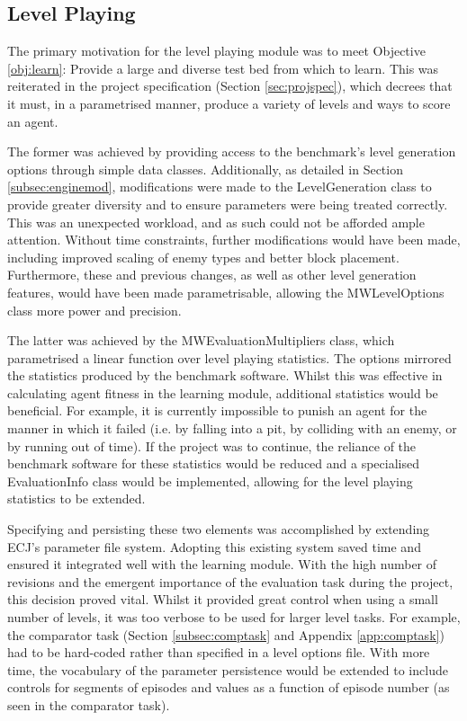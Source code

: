 
\subsection{Level Playing}

The primary motivation for the level playing module was to meet Objective \ref{obj:learn}: Provide a large and diverse test bed from which to learn. This was reiterated in the project specification (Section \ref{sec:projspec}), which decrees that it must, in a parametrised manner, produce a variety of levels and ways to score an agent.

The former was achieved by providing access to the benchmark's level generation options through simple data classes. Additionally, as detailed in Section \ref{subsec:enginemod}, modifications were made to the LevelGeneration class to provide greater diversity and to ensure parameters were being treated correctly. This was an unexpected workload, and as such could not be afforded ample attention. Without time constraints, further modifications would have been made, including improved scaling of enemy types and better block placement. Furthermore, these and previous changes, as well as other level generation features, would have been made parametrisable, allowing the MWLevelOptions class more power and precision.

The latter was achieved by the MWEvaluationMultipliers class, which parametrised a linear function over level playing statistics. The options mirrored the statistics produced by the benchmark software. Whilst this was effective in calculating agent fitness in the learning module, additional statistics would be beneficial. For example, it is currently impossible to punish an agent for the manner in which it failed (i.e. by falling into a pit, by colliding with an enemy, or by running out of time). If the project was to continue, the reliance of the benchmark software for these statistics would be reduced and a specialised EvaluationInfo class would be implemented, allowing for the level playing statistics to be extended.

Specifying and persisting these two elements was accomplished by extending ECJ's parameter file system. Adopting this existing system saved time and ensured it integrated well with the learning module. With the high number of revisions and the emergent importance of the evaluation task during the project, this decision proved vital. Whilst it provided great control when using a small number of levels, it was too verbose to be used for larger level tasks. For example, the comparator task (Section \ref{subsec:comptask} and Appendix \ref{app:comptask}) had to be hard-coded rather than specified in a level options file. With more time, the vocabulary of the parameter persistence would be extended to include controls for segments of episodes and values as a function of episode number (as seen in the comparator task).

